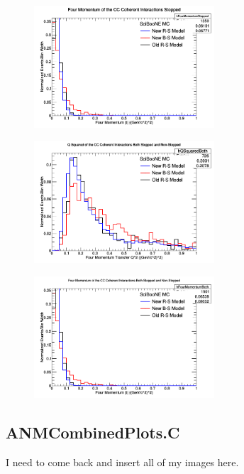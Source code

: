\documentclass[11pt]{article}
\begin{document}
\begin{figure}[H]
\centering
\includegraphics[width=0.6\textwidth]{NMFourSquaredPlottingImages/4-NMFourSquaredPlotting.png}
\caption{}
\end{figure}

\begin{figure}[H]
\centering
\includegraphics[width=0.6\textwidth]{NMFourSquaredPlottingImages/5-NMFourSquaredPlotting.png}
\caption{}
\end{figure}

\begin{figure}[H]
\centering
\includegraphics[width=0.6\textwidth]{NMFourSquaredPlottingImages/6-NMFourSquaredPlotting.png}
\caption{}
\end{figure}

\subsection{ANMCombinedPlots.C}
I need to come back and insert all of my images here.
\end{document}
